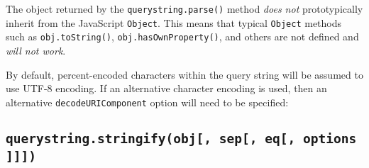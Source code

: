 \begin{Shaded}
\begin{Highlighting}[]
\FunctionTok{\{}
  \FunctionTok{:} \FunctionTok{,}
  \FunctionTok{:} \OtherTok{[}\OtherTok{,} \OtherTok{]}
\FunctionTok{\}}
\end{Highlighting}
\end{Shaded}

The object returned by the \texttt{querystring.parse()} method
\emph{does not} prototypically inherit from the JavaScript
\texttt{Object}. This means that typical \texttt{Object} methods such as
\texttt{obj.toString()}, \texttt{obj.hasOwnProperty()}, and others are
not defined and \emph{will not work}.

By default, percent-encoded characters within the query string will be
assumed to use UTF-8 encoding. If an alternative character encoding is
used, then an alternative \texttt{decodeURIComponent} option will need
to be specified:

\begin{Shaded}
\begin{Highlighting}[]

\NormalTok{(}\OperatorTok{,} \OperatorTok{,} \OperatorTok{,}
\NormalTok{                  \{ }\OperatorTok{:}\OperatorTok{;}
\end{Highlighting}
\end{Shaded}

\subsection{\texorpdfstring{\texttt{querystring.stringify(obj{[},\ sep{[},\ eq{[},\ options{]}{]}{]})}}{querystring.stringify(obj{[}, sep{[}, eq{[}, options{]}{]}{]})}}\label{querystring.stringifyobj-sep-eq-options}

